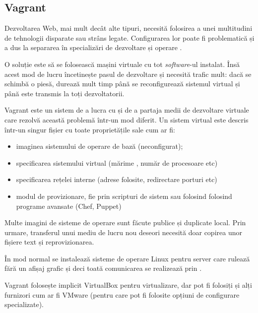 \documentclass[a4wide,12pt]{report}
\newcommand{\eng}[1]{\emph{#1}} %
\newcommand{\acr}[1]{{\textsmaller[1]{\textsc{#1}}}} %
\begin{document}
\subsection{Vagrant}

Dezvoltarea Web, mai mult decât alte tipuri, necesită folosirea a unei
multitudini de tehnologii disparate sau strâns legate. Configurarea lor poate fi
problematică și a dus la separarea în specializări de dezvoltare și operare
\acr{IT}.

O soluție este să se folosească mașini virtuale cu tot \eng{software}-ul
instalat. Însă acest mod de lucru încetinește pasul de dezvoltare și necesită
trafic mult: dacă se schimbă o piesă, durează mult timp până se reconfigurează
sistemul virtual și până este transmis la toți dezvoltatorii.

Vagrant este un sistem de a lucra cu și de a partaja medii de dezvoltare
virtuale care rezolvă această problemă într-un mod diferit. Un sistem virtual
este descris într-un singur fișier cu toate proprietățile sale cum ar fi:

\begin{itemize}

\item imaginea sistemului de operare de bază (neconfigurat);

\item specificarea sistemului virtual (mărime \acr{RAM}, număr de procesoare
etc)

\item specificarea rețelei interne (adrese \acr{IP} folosite, redirectare
porturi etc)

\item modul de provizionare, fie prin scripturi de sistem sau folosind folosind
programe avansate (Chef, Puppet)

\end{itemize}

Multe imagini de sisteme de operare sunt făcute publice și duplicate local. Prin
urmare, transferul unui mediu de lucru nou deseori necesită doar copirea unor
fișiere text și reprovizionarea.

În mod normal se instalează sisteme de operare Linux pentru server care rulează
fără un afișaj grafic și deci toată comunicarea se realizează prin \acr{SSH}.

Vagrant folosește implicit VirtualBox pentru virtualizare, dar pot fi folosiți
și alți furnizori cum ar fi VMware (pentru care pot fi folosite opțiuni de
configurare specializate).
\end{document}
